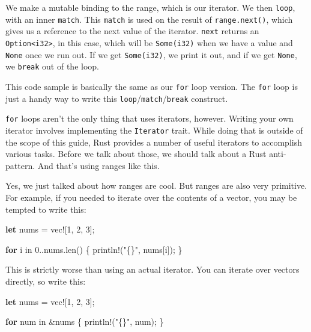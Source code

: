\documentclass[a4paper,]{book}
\newenvironment{Shaded}{\begin{snugshade}}{\end{snugshade}}
\newcommand{\KeywordTok}[1]{\textcolor[rgb]{0.13,0.29,0.53}{\textbf{{#1}}}}
\newcommand{\DecValTok}[1]{\textcolor[rgb]{0.00,0.00,0.81}{{#1}}}
\newcommand{\StringTok}[1]{\textcolor[rgb]{0.31,0.60,0.02}{{#1}}}
\newcommand{\OtherTok}[1]{\textcolor[rgb]{0.56,0.35,0.01}{{#1}}}
\newcommand{\NormalTok}[1]{{#1}}
\begin{document}
We make a mutable binding to the range, which is our iterator. We then
\texttt{loop}, with an inner \texttt{match}. This \texttt{match} is used
on the result of \texttt{range.next()}, which gives us a reference to
the next value of the iterator. \texttt{next} returns an
\texttt{Option\textless{}i32\textgreater{}}, in this case, which will be
\texttt{Some(i32)} when we have a value and \texttt{None} once we run
out. If we get \texttt{Some(i32)}, we print it out, and if we get
\texttt{None}, we \texttt{break} out of the loop.

This code sample is basically the same as our \texttt{for} loop version.
The \texttt{for} loop is just a handy way to write this
\texttt{loop}/\texttt{match}/\texttt{break} construct.

\texttt{for} loops aren't the only thing that uses iterators, however.
Writing your own iterator involves implementing the \texttt{Iterator}
trait. While doing that is outside of the scope of this guide, Rust
provides a number of useful iterators to accomplish various tasks.
Before we talk about those, we should talk about a Rust anti-pattern.
And that's using ranges like this.

Yes, we just talked about how ranges are cool. But ranges are also very
primitive. For example, if you needed to iterate over the contents of a
vector, you may be tempted to write this:

\begin{Shaded}
\begin{Highlighting}[]
\KeywordTok{let} \NormalTok{nums = }\OtherTok{vec!}\NormalTok{[}\DecValTok{1}\NormalTok{, }\DecValTok{2}\NormalTok{, }\DecValTok{3}\NormalTok{];}

\KeywordTok{for} \NormalTok{i in }\DecValTok{0.}\NormalTok{.nums.len() \{}
    \OtherTok{println!}\NormalTok{(}\StringTok{"\{\}"}\NormalTok{, nums[i]);}
\NormalTok{\}}
\end{Highlighting}
\end{Shaded}

This is strictly worse than using an actual iterator. You can iterate
over vectors directly, so write this:

\begin{Shaded}
\begin{Highlighting}[]
\KeywordTok{let} \NormalTok{nums = }\OtherTok{vec!}\NormalTok{[}\DecValTok{1}\NormalTok{, }\DecValTok{2}\NormalTok{, }\DecValTok{3}\NormalTok{];}

\KeywordTok{for} \NormalTok{num in &nums \{}
    \OtherTok{println!}\NormalTok{(}\StringTok{"\{\}"}\NormalTok{, num);}
\NormalTok{\}}
\end{Highlighting}
\end{Shaded}
\end{document}
